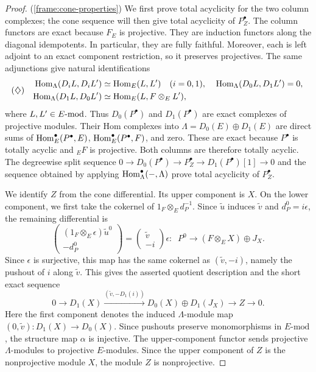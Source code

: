 \documentclass[11pt]{article}
\begin{document}
\begin{proof}
\textup{(\ref{frame:cone-properties})}
We first prove total acyclicity for the two column complexes;
the cone sequence will then give total acyclicity of $P_Z^\bullet$.
The column functors are exact because $F_E$ is projective.
They are induction functors along the diagonal idempotents. In particular, they are fully faithful.
Moreover, each is left adjoint to an exact component restriction, so it preserves projectives.
The same adjunctions give natural identifications
\begin{equation*}
(\diamondsuit)\quad
\begin{aligned}
  {\rm Hom}_\Lambda(D_iL,D_iL')&\simeq{\rm Hom}_E(L,L')\quad(i=0,1),\;
  &{\rm Hom}_\Lambda(D_0L,D_1L')&=0,\;\\
  {\rm Hom}_\Lambda(D_1L,D_0L')&\simeq{\rm Hom}_E(L,F\otimes_E L'),
 \end{aligned}
\end{equation*}
where $L, L'\in E\mbox{{\rm -mod}}$.
Thus $D_0(P^\bullet)$ and $D_1(P^\bullet)$ are exact complexes
of projective modules. Their Hom complexes into
$\Lambda=D_0(E)\oplus D_1(E)$ are direct sums of
${\rm Hom}_E^\bullet(P^\bullet,E)$,
${\rm Hom}_E^\bullet(P^\bullet,F)$, and zero. These are exact because
$P^\bullet$ is totally acyclic and ${_E}F$ is projective. Both columns are therefore totally acyclic.
The degreewise split sequence
$0\to D_0(P^\bullet)\to P_Z^\bullet \to D_1(P^\bullet)[1]\to 0$
and the sequence obtained by applying
${\rm Hom}_\Lambda^\bullet(-,\Lambda)$ prove total acyclicity of
$P_Z^\bullet$.

We identify $Z$ from the cone differential. Its upper component
is $X$. On the lower component, we first take the cokernel of
$1_F\otimes_Ed_P^{-1}$. Since $\widetilde u$ induces
$\widetilde v$ and $d_P^0=i\epsilon$, the remaining differential is
\[
 \begin{pmatrix}
 (1_F\otimes_E\epsilon)\widetilde u^0\\-d_P^0
 \end{pmatrix}
 =\begin{pmatrix}\widetilde v\\-i\end{pmatrix}\epsilon:\;\;
 P^0\longrightarrow(F\otimes_E X)\oplus J_X.
\]
Since $\epsilon$ is surjective, this map has the same cokernel
as $(\widetilde v,-i)$, namely the pushout of $i$ along
$\widetilde v$. This gives the asserted quotient description
and the short exact sequence
\begin{equation*}
 0\longrightarrow D_1(X)
 \xrightarrow{(\widetilde v,-D_1(i))}
 D_0(X)\oplus D_1(J_X)\longrightarrow Z\longrightarrow0.
\end{equation*}
Here the first component denotes the induced $\Lambda$-module map
$(0,\widetilde v):D_1(X)\to D_0(X)$.
Since pushouts preserve monomorphisms in $E\text{-}\mathrm{mod}$,
the structure map $\alpha$ is injective.
The upper-component functor sends projective $\Lambda$-modules
to projective $E$-modules. Since the upper component of $Z$ is
the nonprojective module $X$, the module $Z$ is nonprojective.


\end{proof}
\end{document}

